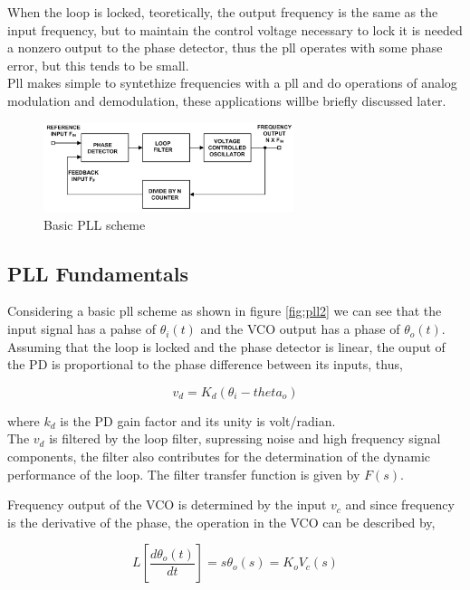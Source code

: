 When the loop is locked, teoretically, the output frequency is the same as the
input frequency, but to maintain the control voltage necessary to lock it is
needed a nonzero output to the phase detector, thus the pll operates with some
phase error, but this tends to be small.\\

Pll makes simple to syntethize frequencies with a pll and do operations 
of analog modulation and demodulation, these applications willbe briefly 
discussed later.


\begin{figure}[htbp]
    \centering
    \includegraphics[width=0.65\textwidth]{./figures/pll.eps}
    \caption{ Basic PLL scheme
    \label{fig:pll}}
\end{figure}

\subsection{PLL Fundamentals}
Considering a basic pll scheme as shown in figure \ref{fig:pll2} we can see that
the input signal has a pahse of $\theta_i(t)$ and the VCO output has a phase of
$\theta_o(t)$. Assuming that the loop is locked and the phase detector is
linear, the ouput of the PD is proportional to the phase difference between its
inputs, thus,

\begin{equation}
    v_d = K_d(\theta_i - theta_o)
    \label{eq:pdout}
\end{equation}

where $k_d$ is the PD gain factor and its unity is volt/radian.\\

The $v_d$ is filtered by the loop filter, supressing noise and high frequency
signal components, the filter also contributes for the determination of the
dynamic performance of the loop. The filter transfer function is given by
$F(s)$.

Frequency output of the VCO is determined by the input $v_c$ and since frequency
is the derivative of the phase, the operation in the VCO can be described by,

\begin{equation}
    L[\frac{d\theta_o(t)}{dt}] = s\theta_o(s)=K_oV_c(s)
    \label{eq:vco}
\end{equation}

